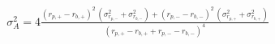 


\begin{eqnarray*}
  \sigma_A^2 = 4 \frac{\left( r_{p,+} - r_{b,+} \right)^2 \, 		\left(\sigma_{r_{p,-}}^2 + \sigma_{r_{b,-}}^2 \right) +
              \left( r_{p,-} - r_{b,-} \right) ^2 \,
              \left( \sigma_{r_{p,+}}^2 + \sigma_{r_{b,+}}^2 \right)}
	{\left( r_{p,+} - r_{b,+} + r_{p,-} - r_{b,-} \right) ^4}
\end{eqnarray*}

